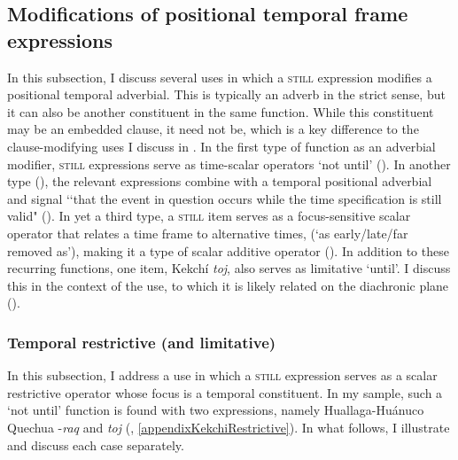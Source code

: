 \subsection{Modifications of positional temporal frame expressions}\label{sectionTemporalFrameSubconstituent}
\largerpage
In this subsection, I discuss several uses in which a \textsc{still} expression modifies a positional temporal adverbial. This is typically an adverb in the strict sense, but it can also be another constituent in the same function. While this constituent may be an embedded clause, it need not be, which is a key difference to the clause-modifying uses I discuss in . In the first type of function as an adverbial modifier, \textsc{still} expressions serve as time-scalar  operators \lq not until\rq{} (). In another type (), the relevant expressions combine with a temporal positional adverbial and signal \lq\lq that the event in question occurs while the time specification is still valid" (\cite[202]{Loebner1989}). In yet a third type, a \textsc{still} item serves as a focus-sensitive scalar operator that relates a time frame to alternative times, (\lq as early/late/far removed as\rq{}), making it a type of scalar additive operator (). In addition to these recurring functions, one item, Kekchí \textit{toj}, also serves as limitative \lq until\rq{}. I discuss this in the context of the  use, to which it is likely related on the diachronic plane ().

\subsubsection{Temporal restrictive (and limitative)}
\label{sectionTimeScalarRestrictive}\largerpage
{}In this subsection, I address a use in which a \textsc{still} expression serves as a scalar restrictive operator whose focus is a temporal constituent. In my sample, such a \lq not until\rq{ }function is found with two expressions, namely Huallaga-Huánuco Quechua \mbox{-\textit{raq}} and  \textit{toj} (, \ref{appendixKekchiRestrictive}). In what follows, I illustrate and discuss each case separately.

